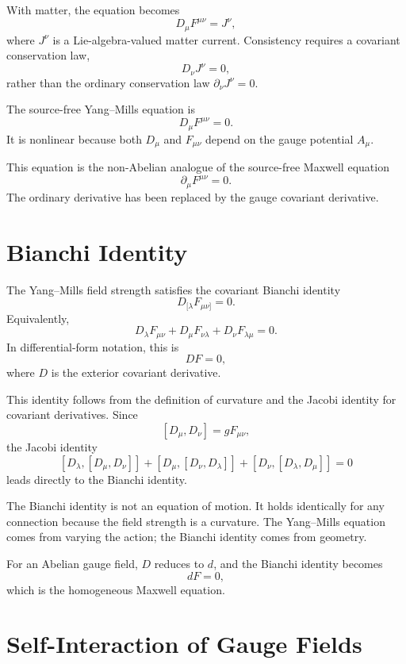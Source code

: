 With matter, the equation becomes
\[
    D_\mu F^{\mu\nu}=J^\nu,
\]
where \(J^\nu\) is a Lie-algebra-valued matter current. Consistency requires a
covariant conservation law,
\[
    D_\nu J^\nu=0,
\]
rather than the ordinary conservation law \(\partial_\nu J^\nu=0\).

\begin{theorembox}
The source-free Yang--Mills equation is
\[
    D_\mu F^{\mu\nu}=0.
\]
It is nonlinear because both \(D_\mu\) and \(F_{\mu\nu}\) depend on the gauge
potential \(A_\mu\).
\end{theorembox}

This equation is the non-Abelian analogue of the source-free Maxwell equation
\[
    \partial_\mu F^{\mu\nu}=0.
\]
The ordinary derivative has been replaced by the gauge covariant derivative.

\section{Bianchi Identity}

The Yang--Mills field strength satisfies the covariant Bianchi identity
\[
    D_{[\lambda}F_{\mu\nu]}=0.
\]
Equivalently,
\[
    D_\lambda F_{\mu\nu}
    +D_\mu F_{\nu\lambda}
    +D_\nu F_{\lambda\mu}=0.
\]
In differential-form notation, this is
\[
    DF=0,
\]
where \(D\) is the exterior covariant derivative.

This identity follows from the definition of curvature and the Jacobi identity
for covariant derivatives. Since
\[
    [D_\mu,D_\nu]=gF_{\mu\nu},
\]
the Jacobi identity
\[
    [D_\lambda,[D_\mu,D_\nu]]
    +[D_\mu,[D_\nu,D_\lambda]]
    +[D_\nu,[D_\lambda,D_\mu]]=0
\]
leads directly to the Bianchi identity.

\begin{remarkbox}
The Bianchi identity is not an equation of motion. It holds identically for any
connection because the field strength is a curvature. The Yang--Mills equation
comes from varying the action; the Bianchi identity comes from geometry.
\end{remarkbox}

For an Abelian gauge field, \(D\) reduces to \(d\), and the Bianchi identity
becomes
\[
    dF=0,
\]
which is the homogeneous Maxwell equation.

\section{Self-Interaction of Gauge Fields}

